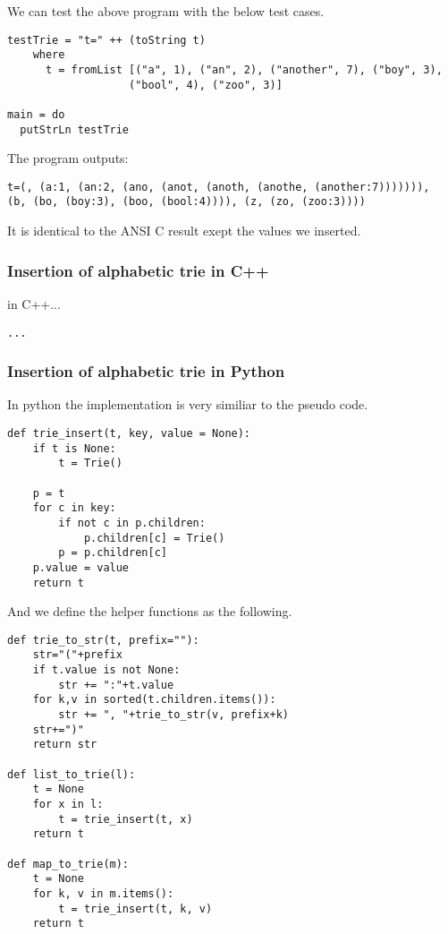 \documentclass{article}
\begin{document}
We can test the above program with the below test cases.

\begin{lstlisting}
testTrie = "t=" ++ (toString t)
    where 
      t = fromList [("a", 1), ("an", 2), ("another", 7), ("boy", 3), 
                   ("bool", 4), ("zoo", 3)]

main = do
  putStrLn testTrie
\end{lstlisting}

The program outputs:

\begin{verbatim}
t=(, (a:1, (an:2, (ano, (anot, (anoth, (anothe, (another:7))))))), 
(b, (bo, (boy:3), (boo, (bool:4)))), (z, (zo, (zoo:3))))
\end{verbatim}

It is identical to the ANSI C result exept the values we inserted.

\subsubsection*{Insertion of alphabetic trie in C++}
in C++...

\lstset{language=C++}
\begin{lstlisting}
...
\end{lstlisting}


\subsubsection*{Insertion of alphabetic trie in Python}
In python the implementation is very similiar to the pseudo code.

\lstset{language=Python}
\begin{lstlisting}
def trie_insert(t, key, value = None):
    if t is None:
        t = Trie()

    p = t
    for c in key:
        if not c in p.children: 
            p.children[c] = Trie()
        p = p.children[c]
    p.value = value
    return t
\end{lstlisting}

And we define the helper functions as the following.

\begin{lstlisting}
def trie_to_str(t, prefix=""):
    str="("+prefix
    if t.value is not None:
        str += ":"+t.value
    for k,v in sorted(t.children.items()):
        str += ", "+trie_to_str(v, prefix+k)
    str+=")"
    return str

def list_to_trie(l):
    t = None
    for x in l:
        t = trie_insert(t, x)
    return t

def map_to_trie(m):
    t = None
    for k, v in m.items():
        t = trie_insert(t, k, v)
    return t
\end{lstlisting}
\end{document}
